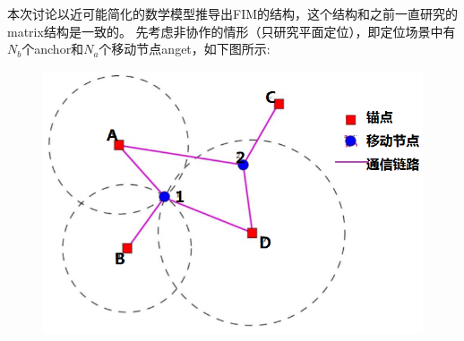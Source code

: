 \documentclass[12pt]{article}
\begin{document}
\title{\textbf{}} 

\author{}
\maketitle
\large
本次讨论以近可能简化的数学模型推导出FIM的结构，这个结构和之前一直研究的matrix结构是一致的。
先考虑非协作的情形（只研究平面定位），即定位场景中有$N_b$个anchor和$N_a$个移动节点anget，如下图所示:
\begin{figure}[!ht]
\includegraphics[width=\textwidth]{002.png}
\end{figure}
\end{document}
